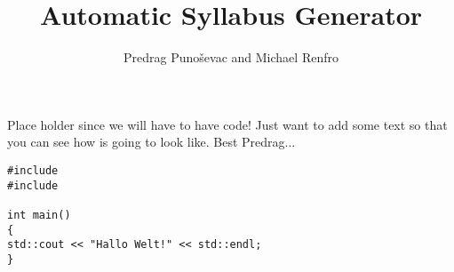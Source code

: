 \documentclass{pracjourn}
\title{Automatic Syllabus Generator}
\author{Predrag Puno\v{s}evac and Michael Renfro}
\begin{document}
\maketitle


Place holder since we will have to have code! Just want to add some text
so that you can see how is going to look like. Best Predrag...


\begin{lstlisting}
#include
#include
       
int main()
{
std::cout << "Hallo Welt!" << std::endl;
}
\end{lstlisting}

\nocite{*}

 
\end{document}
